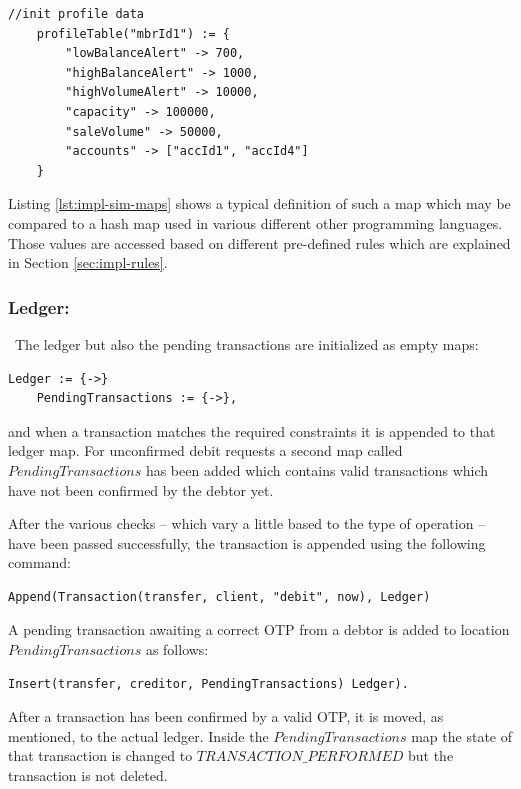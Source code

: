 \begin{center}
\begin{minipage}{0.8\textwidth}
\small
\begin{lstlisting}[language=bsl_lst,caption={\bf\small $MAP$ example showing a profile table entry},label={lst:impl-sim-maps} ]
	//init profile data
	profileTable("mbrId1") := {
		"lowBalanceAlert" -> 700,
		"highBalanceAlert" -> 1000,		
		"highVolumeAlert" -> 10000,
		"capacity" -> 100000,
		"saleVolume" -> 50000,
		"accounts" -> ["accId1", "accId4"]
	}
\end{lstlisting}
\end{minipage}
\end{center}

Listing \ref{lst:impl-sim-maps} shows a typical definition of such a map which may be compared to a hash map used in various different other programming languages. Those values are accessed based on different pre-defined rules which are explained in Section \ref{sec:impl-rules}.

\subsubsection{Ledger: }\ The ledger but also the pending transactions are initialized as empty maps:
\begin{lstlisting}[language=bsl]
	Ledger := {->}
	PendingTransactions := {->},
\end{lstlisting}
and when a transaction matches the required constraints it is appended to that ledger map. For unconfirmed debit requests a second map called $PendingTransactions$ has been added which contains valid transactions which have not been confirmed by the debtor yet.

After the various checks -- which vary a little based to the type of operation -- have been passed successfully, the transaction is appended using the following command:
\begin{lstlisting}[language=bsl]
	Append(Transaction(transfer, client, "debit", now), Ledger)
\end{lstlisting}

A pending transaction awaiting a correct OTP from a debtor is added to location $PendingTransactions$ as follows:
\begin{lstlisting}[language=bsl]
	Insert(transfer, creditor, PendingTransactions) Ledger).
\end{lstlisting}

After a transaction has been confirmed by a valid OTP, it is moved, as mentioned, to the actual ledger. Inside the $PendingTransactions$ map the state of that transaction is changed to $TRANSACTION\_PERFORMED$ but the transaction is not deleted.

